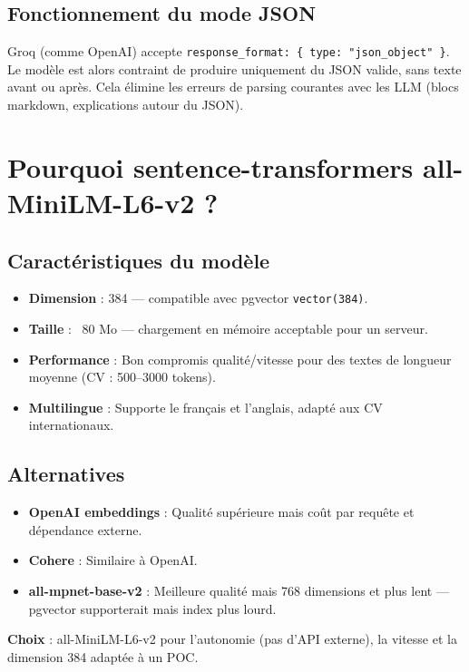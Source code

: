 \documentclass[11pt,a4paper]{report}
\begin{document}
\subsection{Fonctionnement du mode JSON}

Groq (comme OpenAI) accepte \texttt{response\_format: \{ type: "json\_object" \}}. Le modèle est alors contraint de produire uniquement du JSON valide, sans texte avant ou après. Cela élimine les erreurs de parsing courantes avec les LLM (blocs markdown, explications autour du JSON).

\section{Pourquoi sentence-transformers all-MiniLM-L6-v2 ?}

\subsection{Caractéristiques du modèle}

\begin{itemize}[leftmargin=*]
  \item \textbf{Dimension} : 384 — compatible avec pgvector \texttt{vector(384)}.
  \item \textbf{Taille} : ~80 Mo — chargement en mémoire acceptable pour un serveur.
  \item \textbf{Performance} : Bon compromis qualité/vitesse pour des textes de longueur moyenne (CV : 500–3000 tokens).
  \item \textbf{Multilingue} : Supporte le français et l'anglais, adapté aux CV internationaux.
\end{itemize}

\subsection{Alternatives}

\begin{itemize}[leftmargin=*]
  \item \textbf{OpenAI embeddings} : Qualité supérieure mais coût par requête et dépendance externe.
  \item \textbf{Cohere} : Similaire à OpenAI.
  \item \textbf{all-mpnet-base-v2} : Meilleure qualité mais 768 dimensions et plus lent — pgvector supporterait mais index plus lourd.
\end{itemize}

\textbf{Choix} : all-MiniLM-L6-v2 pour l'autonomie (pas d'API externe), la vitesse et la dimension 384 adaptée à un POC.
\end{document}
